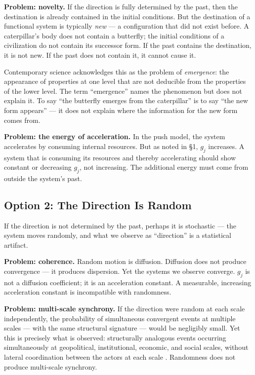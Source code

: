 \documentclass[12pt,a4paper]{article}
\newcommand{\gj}{g_j}
\begin{document}
\textbf{Problem: novelty.} If the direction is fully determined by the past, then the destination is already contained in the initial conditions. But the destination of a functional system is typically \emph{new} --- a configuration that did not exist before. A caterpillar's body does not contain a butterfly; the initial conditions of a civilization do not contain its successor form. If the past contains the destination, it is not new. If the past does not contain it, it cannot cause it.

Contemporary science acknowledges this as the problem of \emph{emergence}: the appearance of properties at one level that are not deducible from the properties of the lower level. The term ``emergence'' names the phenomenon but does not explain it. To say ``the butterfly emerges from the caterpillar'' is to say ``the new form appears'' --- it does not explain where the information for the new form comes from.

\textbf{Problem: the energy of acceleration.} In the push model, the system accelerates by consuming internal resources. But as noted in \S1, $\gj$ increases. A system that is consuming its resources and thereby accelerating should show constant or decreasing $\gj$, not increasing. The additional energy must come from outside the system's past.

\subsection{Option 2: The Direction Is Random}

If the direction is not determined by the past, perhaps it is stochastic --- the system moves randomly, and what we observe as ``direction'' is a statistical artifact.

\textbf{Problem: coherence.} Random motion is diffusion. Diffusion does not produce convergence --- it produces dispersion. Yet the systems we observe converge. $\gj$ is not a diffusion coefficient; it is an acceleration constant. A measurable, increasing acceleration constant is incompatible with randomness.

\textbf{Problem: multi-scale synchrony.} If the direction were random at each scale independently, the probability of simultaneous convergent events at multiple scales --- with the same structural signature --- would be negligibly small. Yet this is precisely what is observed: structurally analogous events occurring simultaneously at geopolitical, institutional, economic, and social scales, without lateral coordination between the actors at each scale \cite{ghioni2026collapse}. Randomness does not produce multi-scale synchrony.
\end{document}

